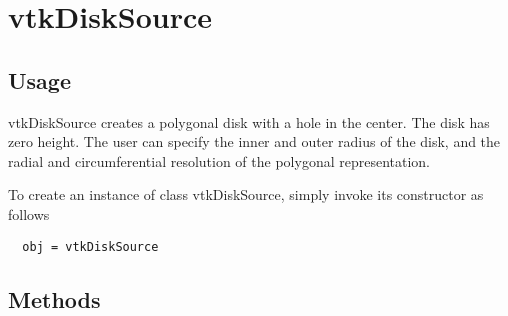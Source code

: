 \section{vtkDiskSource}

\subsection{Usage}

 vtkDiskSource creates a polygonal disk with a hole in the center. The 
 disk has zero height. The user can specify the inner and outer radius
 of the disk, and the radial and circumferential resolution of the 
 polygonal representation. 

To create an instance of class vtkDiskSource, simply
invoke its constructor as follows
\begin{verbatim}
  obj = vtkDiskSource
\end{verbatim}
\subsection{Methods}

